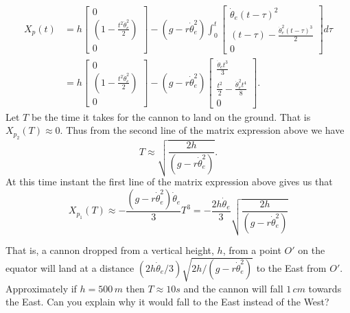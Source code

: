 \documentclass[graybox,envcountchap,sectrefs]{svmonoMuga}
\begin{document}
\begin{example}
\begin{align*}
X_p(t)&=h\begin{bmatrix}0\\
\left(1-\frac{t^2\dot{\theta}_e^2}{2}\right)\\ 0
\end{bmatrix}
-(g-r\dot{\theta}_e^2)\int_0^t\begin{bmatrix}\dot{\theta}_e(t-\tau)^2 \\ (t-\tau)-\frac{\dot{\theta}_e^2(t-\tau)^3}{2} \\0\end{bmatrix}d\tau\\
&=h\begin{bmatrix}0\\
\left(1-\frac{t^2\dot{\theta}_e^2}{2}\right)\\ 0
\end{bmatrix}
-(g-r\dot{\theta}_e^2)\begin{bmatrix}\frac{\dot{\theta}_et^3}{3} \\ \frac{t^2}{2}-\frac{\dot{\theta}_e^2t^4}{8} \\0\end{bmatrix}.
\end{align*}
Let $T$ be the time it takes for the cannon to land on the ground. That is $X_{p_2}(T)\approx 0$. Thus from the second line of the matrix expression above we have
\[
T\approx\sqrt{\frac{2h}{(g-r\dot{\theta}_e^2)}}.
\]
At this time instant the first line of the matrix expression above gives us that
\[
X_{p_1}(T)\approx -\frac{(g-r\dot{\theta}_e^2)\dot{\theta}_e}{3}T^3=-\frac{2h\dot{\theta}_e}{3}\sqrt{\frac{2h}{(g-r\dot{\theta}_e^2)}}
\]



That is, a cannon dropped from a vertical height, $h$, from a point $O'$ on the equator will land at a distance ${(2h\dot{\theta}_e/3)}\sqrt{{2h}/{(g-r\dot{\theta}_e^2)}}$ to the East from $O'$. Approximately if 
$h=500\,m$ then $T\approx 10s$ and the cannon will fall $1\,cm$ towards the East. Can you explain why it would fall to the East instead of the West?
\end{example}












\end{document}
